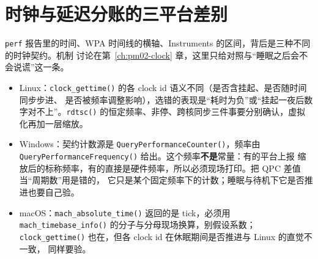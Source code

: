 \documentclass[12pt,a4paper,fontset=fandol]{ctexbook}
\newcommand{\Fn}[1]{\texttt{#1()}}
\newcommand{\Tp}[1]{\texttt{#1}}
\newcommand{\Bk}{\discretionary{}{}{}}
\begin{document}
\section{时钟与延迟分账的三平台差别}

\Tp{perf} 报告里的时间、WPA 时间线的横轴、Instruments 的区间，背后是三种不同的时钟契约。机制
讨论在第~\ref{ch:pm02-clock} 章，这里只给对照与``睡眠之后会不会说谎''这一条。

\begin{itemize}
  \item Linux：\Fn{clock{\Bk}\_gettime} 的各 clock id 语义不同（是否含挂起、是否随时间同步步进、
        是否被频率调整影响），选错的表现是``耗时为负''或``挂起一夜后数字对不上''。\Fn{rdtsc}
        的恒定频率、非停、跨核同步三件事要分别确认，虚拟化再加一层缩放。
  \item Windows：契约计数源是 \Fn{Query{\Bk}Performance{\Bk}Counter}，频率由
        \Fn{Query{\Bk}Performance{\Bk}Frequency} 给出。这个频率\textbf{不是}常量：有的平台上报
        缩放后的标称频率，有的直接是硬件频率，所以必须现场打印。把 QPC 差值当``周期数''用是错的，
        它只是某个固定频率下的计数；睡眠与待机下它是否推进也要自己验。
  \item macOS：\Fn{mach{\Bk}\_absolute{\Bk}\_time} 返回的是 tick，必须用
        \Fn{mach{\Bk}\_timebase{\Bk}\_info} 的分子与分母现场换算，别假设系数；
        \Fn{clock{\Bk}\_gettime} 也在，但各 clock id 在休眠期间是否推进与 Linux 的直觉不一致，
        同样要验。
\end{itemize}
\end{document}
